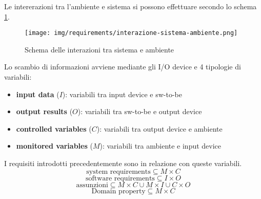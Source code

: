 Le intererazioni tra l'ambiente e sistema si possono effettuare secondo lo
schema \ref{fig:int-sistema-ambiente}.
\begin{figure}[!ht]
      \centering
      \texttt{[image: img/requirements/interazione-sistema-ambiente.png]}
      \caption{Schema delle interazioni tra sistema e ambiente}
      \label{fig:int-sistema-ambiente}
\end{figure}
Lo scambio di informazioni avviene mediante gli I/O device e 4 tipologie di variabili:
\begin{itemize}
      \item \textbf{input data} ($I$): variabili tra input device e sw-to-be
      \item \textbf{output results} ($O$): variabili tra sw-to-be e output device
      \item \textbf{controlled variables} ($C$): variabili tra output device e ambiente
      \item \textbf{monitored variables} ($M$): variabili tra ambiente e input device
\end{itemize}
I requisiti introdotti precedentemente sono in relazione con queste variabili.
$$\text{system requirements} \subseteq M\times C$$
$$\text{software requirements} \subseteq I\times O$$
$$\text{assunzioni} \subseteq M\times C\cup M\times I\cup C\times O$$
$$\text{Domain property}\subseteq M\times C$$
